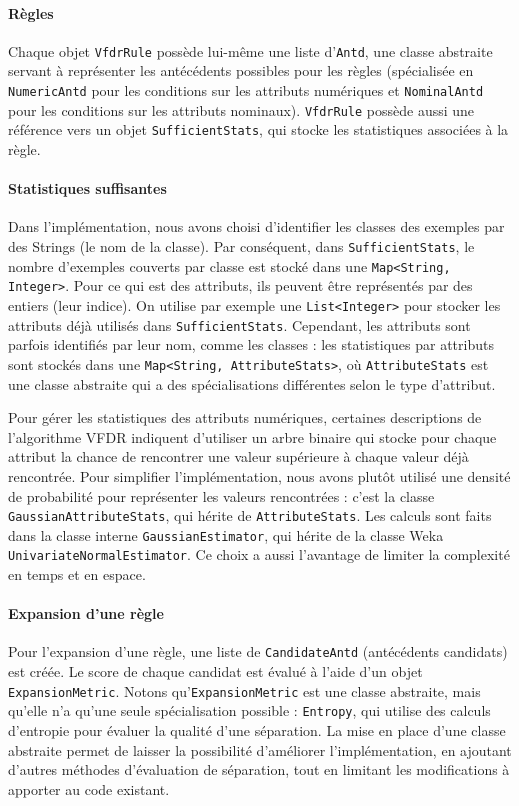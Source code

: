         \paragraph{Règles}Chaque objet \texttt{VfdrRule} possède lui-même une liste d’\texttt{Antd}, une classe abstraite servant à représenter les antécédents possibles pour les règles (spécialisée en \texttt{NumericAntd} pour les conditions sur les attributs numériques et \texttt{NominalAntd} pour les conditions sur les attributs nominaux). \texttt{VfdrRule} possède aussi une référence vers un objet \texttt{SufficientStats}, qui stocke les statistiques associées à la règle. 


        \paragraph{Statistiques suffisantes} 
            Dans l’implémentation, nous avons choisi d’identifier les classes des exemples par des Strings (le nom de la classe). Par conséquent, dans \texttt{SufficientStats}, le nombre d’exemples couverts par classe est stocké dans une \texttt{Map<String, Integer>}. Pour ce qui est des attributs, ils peuvent être représentés par des entiers (leur indice). On utilise par exemple une \texttt{List<Integer>} pour stocker les attributs déjà utilisés dans \texttt{SufficientStats}. Cependant, les attributs sont parfois identifiés par leur nom, comme les classes : les statistiques par attributs sont stockés dans une \texttt{Map<String, \texttt{AttributeStats}>}, où \texttt{AttributeStats} est une classe abstraite qui a des spécialisations différentes selon le type d’attribut.
            
            Pour gérer les statistiques des attributs numériques, certaines descriptions de l'algorithme VFDR indiquent d’utiliser un arbre binaire qui stocke pour chaque attribut la chance de rencontrer une valeur supérieure à chaque valeur déjà rencontrée. Pour simplifier l’implémentation, nous avons plutôt utilisé une densité de probabilité pour représenter les valeurs rencontrées : c’est la classe \texttt{GaussianAttributeStats}, qui hérite de \texttt{AttributeStats}. Les calculs sont faits dans la classe interne \texttt{GaussianEstimator}, qui hérite de la classe Weka \texttt{UnivariateNormalEstimator}. Ce choix a aussi l’avantage de limiter la complexité en temps et en espace.
        
        \paragraph{Expansion d'une règle} Pour l’expansion d’une règle, une liste de \texttt{CandidateAntd} (antécédents candidats) est créée. Le score de chaque candidat est évalué à l’aide d’un objet \texttt{ExpansionMetric}. Notons qu’\texttt{ExpansionMetric} est une classe abstraite, mais qu’elle n’a qu’une seule spécialisation possible : \texttt{Entropy}, qui utilise des calculs d’entropie pour évaluer la qualité d’une séparation. La mise en place d’une classe abstraite permet de laisser la possibilité d’améliorer l’implémentation, en ajoutant d'autres méthodes d’évaluation de séparation, tout en limitant les modifications à apporter au code existant.
        
